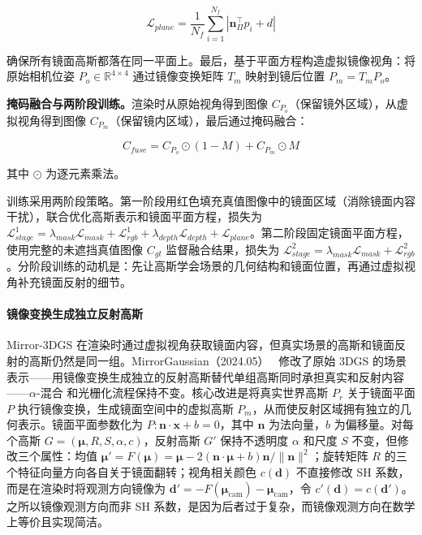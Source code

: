 \begin{equation}
\mathcal{L}_{plane} = \frac{1}{N_f}\sum_{i=1}^{N_f}|\mathbf{n}_\Pi^\top p_i + d|
\end{equation}

确保所有镜面高斯都落在同一平面上。最后，基于平面方程构造虚拟镜像视角：将原始相机位姿 $P_o \in \mathbb{R}^{4 \times 4}$ 通过镜像变换矩阵 $T_m$ 映射到镜后位置 $P_m = T_m P_o$。

\textbf{掩码融合与两阶段训练。}渲染时从原始视角得到图像 $C_{P_o}$（保留镜外区域），从虚拟视角得到图像 $C_{P_m}$（保留镜内区域），最后通过掩码融合：

\begin{equation}
C_{fuse} = C_{P_o} \odot (1 - M) + C_{P_m} \odot M
\end{equation}

其中 $\odot$ 为逐元素乘法。

训练采用两阶段策略。第一阶段用红色填充真值图像中的镜面区域（消除镜面内容干扰），联合优化高斯表示和镜面平面方程，损失为 $\mathcal{L}_{stage}^1 = \lambda_{mask}\mathcal{L}_{mask} + \mathcal{L}_{rgb}^1 + \lambda_{depth}\mathcal{L}_{depth} + \mathcal{L}_{plane}$。第二阶段固定镜面平面方程，使用完整的未遮挡真值图像 $C_{gt}$ 监督融合结果，损失为 $\mathcal{L}_{stage}^2 = \lambda_{mask}\mathcal{L}_{mask} + \mathcal{L}_{rgb}^2$。分阶段训练的动机是：先让高斯学会场景的几何结构和镜面位置，再通过虚拟视角补充镜面反射的细节。

\paragraph{镜像变换生成独立反射高斯}

Mirror-3DGS 在渲染时通过虚拟视角获取镜面内容，但真实场景的高斯和镜面反射的高斯仍然是同一组。MirrorGaussian（2024.05）~\cite{2405_11921} 修改了原始 3DGS 的场景表示——用镜像变换生成独立的反射高斯替代单组高斯同时承担真实和反射内容——$\alpha$-混合 和光栅化流程保持不变。核心改进是将真实世界高斯 $P_r$ 关于镜面平面 $P$ 执行镜像变换，生成镜面空间中的虚拟高斯 $P_m$，从而使反射区域拥有独立的几何表示。镜面平面参数化为 $P: \mathbf{n} \cdot \mathbf{x} + b = 0$，其中 $\mathbf{n}$ 为法向量，$b$ 为偏移量。对每个高斯 $G=(\boldsymbol{\mu}, R, S, \alpha, c)$，反射高斯 $G'$ 保持不透明度 $\alpha$ 和尺度 $S$ 不变，但修改三个属性：均值 $\boldsymbol{\mu}' = F(\boldsymbol{\mu}) = \boldsymbol{\mu} - 2(\mathbf{n} \cdot \boldsymbol{\mu} + b)\mathbf{n}/\|\mathbf{n}\|^2$；旋转矩阵 $R$ 的三个特征向量方向各自关于镜面翻转；视角相关颜色 $c(\mathbf{d})$ 不直接修改 SH 系数，而是在渲染时将观测方向镜像为 $\mathbf{d}' = -F(\boldsymbol{\mu}_{\text{cam}}) - \boldsymbol{\mu}_{\text{cam}}$，令 $c'(\mathbf{d}) = c(\mathbf{d}')$。之所以镜像观测方向而非 SH 系数，是因为后者过于复杂，而镜像观测方向在数学上等价且实现简洁。

